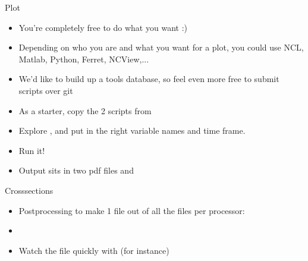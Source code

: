 \begin{frame}{Plot}
 \begin{itemize}
  \item You're completely free to do what you want :)
  \item Depending on who you are and what you want for a plot, you could use NCL, Matlab, Python, Ferret, NCView,...
  \item We'd like to build up a tools database, so feel even more free to submit scripts over git
  \item As a starter, copy the 2  scripts from 
  \item Explore , and put in the right variable names and time frame.
  \item Run it!
  \item Output sits in two pdf files  and 
 \end{itemize}
\end{frame}

\begin{frame}{Crosssections}
\begin{itemize}
 \item Postprocessing to make 1 file out of all the files per processor:
\item {}
\item Watch the file quickly with (for instance) 
\end{itemize}

 

\end{frame}
